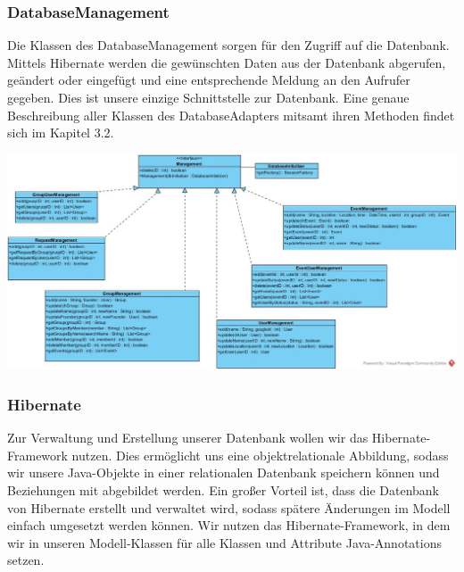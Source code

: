 	\subsubsection{DatabaseManagement}
	Die Klassen des DatabaseManagement sorgen für den Zugriff auf die Datenbank.
	Mittels Hibernate werden die gewünschten Daten aus der Datenbank abgerufen, geändert oder eingefügt und eine entsprechende Meldung an den Aufrufer gegeben.
	Dies ist unsere einzige Schnittstelle zur Datenbank.	
	Eine genaue Beschreibung aller Klassen des DatabaseAdapters mitsamt ihren Methoden findet sich im Kapitel 3.2.

\includegraphics[width=1.1\textwidth]{ManagementClassDiagram.jpg}


	\subsubsection{Hibernate}
	Zur Verwaltung und Erstellung unserer Datenbank wollen wir das Hibernate-Framework nutzen. 
	Dies ermöglicht uns eine objektrelationale Abbildung, sodass wir unsere Java-Objekte in einer relationalen Datenbank speichern können und Beziehungen mit abgebildet werden.
	Ein großer Vorteil ist, dass die Datenbank von Hibernate erstellt und verwaltet wird, sodass spätere Änderungen im Modell einfach umgesetzt werden können.
	Wir nutzen das Hibernate-Framework, in dem wir in unseren Modell-Klassen für alle Klassen und Attribute Java-Annotations setzen.
	

